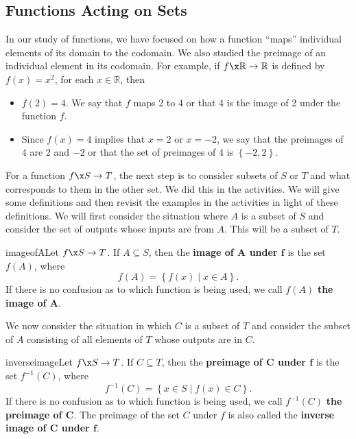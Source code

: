 \subsection*{Functions Acting on Sets}
In our study of functions, we have focused on how a function ``maps'' individual elements of its domain to the codomain.  We also studied the preimage of an individual element in its codomain.  For example, if 
$f\x \mathbb{R} \to \mathbb{R}$ is defined by $f ( x ) = x^2$, for each 
$x \in \mathbb{R}$, then
\begin{itemize}
\item $f ( 2 ) = 4$.  We say that $f$ maps 2 to 4 or that 4 is the image of 2 under the function $f$.

\item Since $f ( x ) = 4$ implies that $x = 2$ or $x = -2$, we say that the preimages of 4 are 2 and $-2$ or that the set of preimages of 4 is $\left\{ -2, 2 \right\}$.
\end{itemize}

For a function $f\x S \to T$, the next step is to consider subsets of $S$ or $T$ and what corresponds to them in the other set.  We did this in the \typel activities.  We will give some definitions and then revisit the examples in the \typel activities in light of these definitions.  We will first consider the situation where $A$ is a subset of $S$ and consider the set of outputs whose inputs are from $A$.  This will be a subset of $T$.

\begin{defbox}{imageofA}{Let $f\x S \to T$\!.  If $A \subseteq S$, then the \textbf{image of 
$\boldsymbol{A}$ under $\boldsymbol{f}$}
%
 is the set $f ( A )$, 
\label{sym:fofA} where
\[
f ( A ) = \left\{f ( x ) \mid x \in A \right\}\!.
\]
If there is no confusion as to which function is being used, we call $f ( A )$ 
\textbf{the image of $\boldsymbol{A}$}.}
\end{defbox}

We now consider the situation in which $C$ is a subset of $T$ and consider the subset of $A$ consisting of all elements of $T$ whose outputs are in $C$.

\begin{defbox}{inverseimage}{Let $f\x S \to T$.  If $C \subseteq T$, then the \textbf{preimage of $\boldsymbol{C}$ under $\boldsymbol{f}$}
%
 is the set $f^{-1} ( C )$, 
\label{sym:preimage} where
\[
f^{-1} ( C ) = \left\{x \in S \mid f ( x ) \in C \right\}.
\]
If there is no confusion as to which function is being used, we call $f^{-1} ( C )$ \textbf{the preimage of $\boldsymbol{C}$}.  The preimage of the set $C$ under $f$ is also called the \textbf{inverse image of $\boldsymbol{C}$ under $\boldsymbol{f}$}\!.}
%
\end{defbox}

